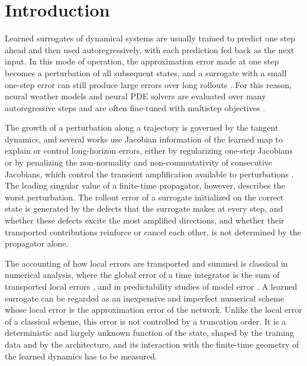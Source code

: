 \section{Introduction}
\label{sec:intro}

Learned surrogates of dynamical systems are usually trained to predict one step ahead and then used autoregressively, with each prediction fed back as the next input. In this mode of operation, the approximation error made at one step becomes a perturbation of all subsequent states, and a surrogate with a small one-step error can still produce large errors over long rollouts \citep{bengio2015,venkatraman2015,lambert2022}. For this reason, neural weather models and neural PDE solvers are evaluated over many autoregressive steps and are often fine-tuned with multistep objectives \citep{brandstetter2022,lam2023,list2025}.

The growth of a perturbation along a trajectory is governed by the tangent dynamics, and several works use Jacobian information of the learned map to explain or control long-horizon errors, either by regularizing one-step Jacobians \citep{pan2018,nie2026} or by penalizing the non-normality and non-commutativity of consecutive Jacobians, which control the transient amplification available to perturbations \citep{pervez2026}. The leading singular value of a finite-time propagator, however, describes the worst perturbation. The rollout error of a surrogate initialized on the correct state is generated by the defects that the surrogate makes at every step, and whether these defects excite the most amplified directions, and whether their transported contributions reinforce or cancel each other, is not determined by the propagator alone.

The accounting of how local errors are transported and summed is classical in numerical analysis, where the global error of a time integrator is the sum of transported local errors \citep[the ``Lady Windermere's fan'' of][]{hairer1993}, and in predictability studies of model error \citep{nicolis2003,vannitsem2002}. A learned surrogate can be regarded as an inexpensive and imperfect numerical scheme whose local error is the approximation error of the network. Unlike the local error of a classical scheme, this error is not controlled by a truncation order. It is a deterministic and largely unknown function of the state, shaped by the training data and by the architecture, and its interaction with the finite-time geometry of the learned dynamics has to be measured.

